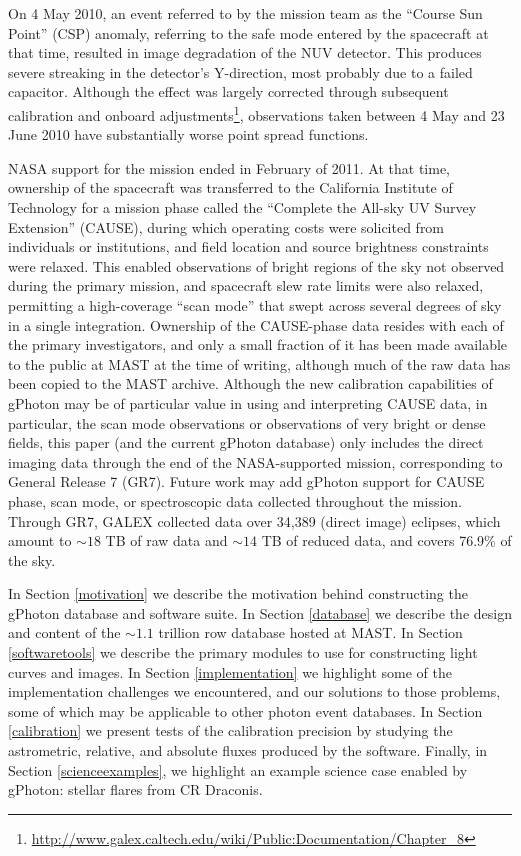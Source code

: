 \documentclass[5p]{elsarticle}
\begin{document}
On 4 May 2010, an event referred to by the mission team as the ``Course Sun Point'' (CSP) anomaly, referring to the safe mode entered by the spacecraft at that time, resulted in image degradation of the NUV detector. This produces severe streaking in the detector's Y-direction, most probably due to a failed capacitor. Although the effect was largely corrected through subsequent calibration and onboard adjustments\footnote{\url{http://www.galex.caltech.edu/wiki/Public:Documentation/Chapter_8}}, observations taken between 4 May and 23 June 2010 have substantially worse point spread functions.

NASA support for the mission ended in February of 2011. At that time, ownership of the spacecraft was transferred to the California Institute of Technology for a mission phase called the ``Complete the All-sky UV Survey Extension'' (CAUSE), during which operating costs were solicited from individuals or institutions, and field location and source brightness constraints were relaxed. This enabled observations of bright regions of the sky not observed during the primary mission, and spacecraft slew rate limits were also relaxed, permitting a high-coverage ``scan mode'' that swept across several degrees of sky in a single integration. Ownership of the CAUSE-phase data resides with each of the primary investigators, and only a small fraction of it has been made available to the public at MAST at the time of writing, although much of the raw data has been copied to the MAST archive. Although the new calibration capabilities of gPhoton may be of particular value in using and interpreting CAUSE data, in particular, the scan mode observations or observations of very bright or dense fields, this paper (and the current gPhoton database) only includes the direct imaging data through the end of the NASA-supported mission, corresponding to General Release 7 (GR7). Future work may add gPhoton support for CAUSE phase, scan mode, or spectroscopic data collected throughout the mission.  Through GR7, GALEX collected data over 34,389 (direct image) eclipses, which amount to $\sim 18$ TB of raw data and $\sim 14$ TB of reduced data, and covers 76.9\% of the sky.

In Section \ref{motivation} we describe the motivation behind constructing the gPhoton database and software suite. In Section \ref{database} we describe the design and content of the $\sim 1.1$ trillion row database hosted at MAST. In Section \ref{softwaretools} we describe the primary modules to use for constructing light curves and images.  In Section \ref{implementation} we highlight some of the implementation challenges we encountered, and our solutions to those problems, some of which may be applicable to other photon event databases. In Section \ref{calibration} we present tests of the calibration precision by studying the astrometric, relative, and absolute fluxes produced by the software.  Finally, in Section \ref{scienceexamples}, we highlight an example science case enabled by gPhoton: stellar flares from CR Draconis.
\end{document}
